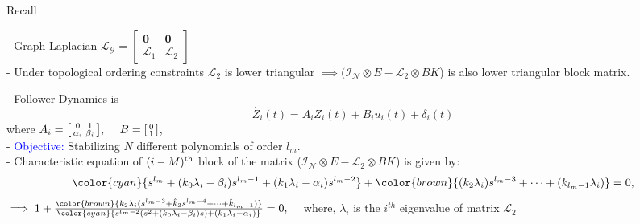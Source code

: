 	\begin{frame}{Recall}
		\vspace{-0.2cm}
		\begin{block}{}
			- Graph Laplacian 
			$\mathcal{L}_{\mathcal{G}}=
			\begin{bmatrix}
				\boldsymbol{0} & \boldsymbol{0}\\
				\mathcal{L}_{1} & \mathcal{L}_{2}
			\end{bmatrix}$\\
			- Under topological ordering constraints $\mathcal{L}_2$ is lower triangular $ \implies (\mathcal{I}_{\mathcal{N}} \otimes E-\mathcal{L}_2 \otimes BK$) is also lower triangular block matrix.
		\end{block}
		\vspace*{-0.2cm}
		\begin{exampleblock}{}
			- Follower Dynamics is $$\dot{Z_i}(t)=A_iZ_{i}(t)+B_iu_{i}(t)+\delta_{i}(t)$$
			where $A_i=
			\begin{bsmallmatrix}
				0 & 1\\
				\alpha_{i} & \beta_{i}
			\end{bsmallmatrix}, ~~~\:B=
			\begin{bsmallmatrix}
				0 \\ 1
			\end{bsmallmatrix}$,\\
			- \textcolor{blue}{Objective: }Stabilizing $N$ different polynomials of order $l_{m}$.\\
			- Characteristic equation of $(i-M)^{\rm th}$ block of the matrix ($\mathcal{I}_{\mathcal{N}} \otimes E-\mathcal{L}_2 \otimes BK$) is given by:
			$$\color{cyan}{s^{l_{m}}+(k_{0}\lambda_{i}-\beta_{i})s^{l_{m}-1} +(k_{1}\lambda_{i}-\alpha_{i})s^{l_{m}-2}}+\color{brown}{(k_{2}\lambda_{i})s^{l_{m}-3}+\dots+(k_{l_{m}-1}\lambda_{i})}=0,$$
			$
				\implies 1+ \frac{\color{brown}{k_{2}\lambda_{i}(s^{l_{m}-3}+\hat{k}_{3}s^{l_{m}-4}+\dots+\hat{k}_{l_{m}-1})}}{\color{cyan}{s^{l_{m}-2}(s^2 + (k_{0}\lambda_{i}-\beta_{i})s)+(k_{1}\lambda_{i}-\alpha_{i})}}=0,~~~
			$ where, $\lambda_{i}$ is the $i^{th}$ eigenvalue of matrix $\mathcal{L}_2$\\
		\end{exampleblock}
	\end{frame}
	
